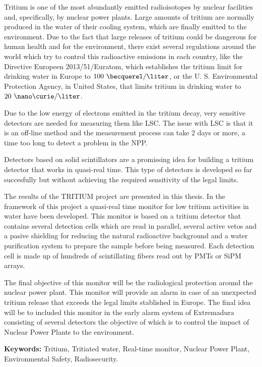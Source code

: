 Tritium is one of the most abundantly emitted radioisotopes by nuclear facilities and, specifically, by nuclear power plants. Large amounts of tritium are normally produced in the water of their cooling system, which are finally emitted to the environment. Due to the fact that large releases of tritium could be dangerous for human health and for the environment, there exist several regulations around the world which try to control this radioactive emissions in each country, like the Directive Europeen 2013/51/Euratom, which establishes the tritium limit for drinking water in Europe to $100~\becquerel/\liter$, or the U. S. Environmental Protection Agency, in United States, that limits tritium in drinking water to $20~\nano\curie/\liter$.

Due to the low energy of electrons emitted in the tritium decay, very sensitive detectors are needed for measuring them like LSC. The issue with LSC is that it is an off-line method and the measurement process can take 2 days or more, a time too long to detect a problem in the NPP.

Detectors based on solid scintillators are a promissing idea for building a tritium detector that works in quasi-real time. This type of detectors is developed so far succesfully but without achieving the required sensitivity of the legal limits.

The results of the TRITIUM project are presented in this thesis. In the framework of this project a quasi-real time monitor for low tritium activities in water have been developed. This monitor is based on a tritium detector that contains several detection cells which are read in parallel, several active vetos and a pasive shielding for reducing the natural radioactive background and a water purification system to prepare the sample before being measured. Each detection cell is made up of hundreds of scintillating fibers read out by PMTs or SiPM arrays.

The final objective of this monitor will be the radiological protection around the nuclear power plant. This monitor will provide an alarm in case of an unexpected tritium release that exceeds the legal limits stablished in Europe. The final idea will be to included this monitor in the early alarm system of Extremadura consisting of several detectors the objective of which is to control the impact of Nuclear Power Plants to the environment.

\vspace{1cm}

\textbf{Keywords:} Tritium, Tritiated water, Real-time monitor, Nuclear Power Plant, Environmental Safety, Radiosecurity.